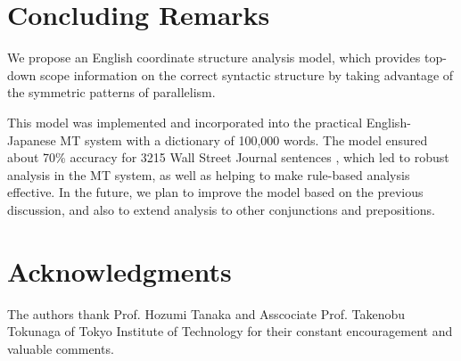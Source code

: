 \vspace{-0.5cm}

\section{Concluding Remarks}

We propose an English coordinate structure analysis model,
which provides top-down scope information on the correct syntactic
structure by taking advantage of the symmetric patterns of
parallelism.

This model was implemented and incorporated into the practical
English-Japanese MT system with a dictionary of 100,000 words. The
model ensured about 70\% accuracy for 3215 Wall Street Journal sentences
, which led to robust analysis in the MT system, as well as helping to
make rule-based analysis effective. In the future, we plan to improve
the model based on the previous discussion, and also to extend analysis
to other conjunctions and prepositions.

\vspace{-0.2cm}

\section{Acknowledgments}

The authors thank Prof. Hozumi Tanaka and Asscociate Prof. Takenobu
Tokunaga of Tokyo Institute of Technology for their constant
encouragement and valuable comments.

\vspace{-0.3cm}




